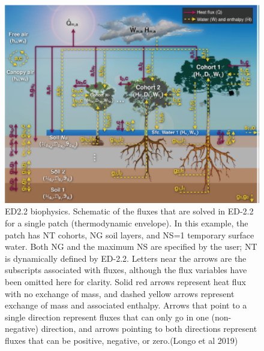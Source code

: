\documentclass[12pt,oneside]{book}
\begin{document}
\begin{figure}

{\centering \includegraphics[width=0.8\linewidth]{figures/chap6/f616_ED_biophysics} 

}

\caption{ED2.2 biophysics. Schematic of the fluxes that are solved in ED-2.2 for a single patch (thermodynamic envelope). In this example, the patch has NT cohorts, NG soil layers, and NS=1 temporary surface water. Both NG and the maximum NS are specified by the user; NT is dynamically defined by ED-2.2. Letters near the arrows are the subscripts associated with fluxes, although the flux variables have been omitted here for clarity. Solid red arrows represent heat flux with no exchange of mass, and dashed yellow arrows represent exchange of mass and associated enthalpy. Arrows that point to a single direction represent fluxes that can only go in one (non-negative) direction, and arrows pointing to both directions represent fluxes that can be positive, negative, or zero.(Longo et al 2019)}\label{fig:f616}
\end{figure}
\end{document}
